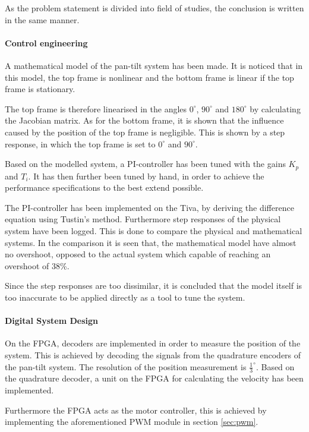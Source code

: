 \documentclass[../../main]{subfiles}
\begin{document}
As the problem statement is divided into field of studies, the conclusion is written in the same manner.

\paragraph{Control engineering}

A mathematical model of the pan-tilt system has been made.
It is noticed that in this model, the top frame is nonlinear and the bottom frame is linear if the top frame is stationary.

The top frame is therefore linearised in the angles $0^\circ$, $90^\circ$ and $180^\circ$ by calculating the Jacobian matrix.
As for the bottom frame, it is shown that the influence caused by the position of the top frame is negligible. This is shown by a step response, in which the top frame is set to $0^\circ$ and $90^\circ$.



Based on the modelled system, a PI-controller has been tuned with the gains $K_p$ and $T_i$. It has then further been tuned by hand, in order to achieve the performance specifications to the best extend possible.

The PI-controller has been implemented on the Tiva, by deriving the difference equation using Tustin's method.
Furthermore step responses of the physical system have been logged. This is done to compare the physical and mathematical systems.
In the comparison it is seen that, the mathematical model have almost no overshoot, opposed to the actual system which capable of reaching an overshoot of 38\%.

Since the step responses are too dissimilar, it is concluded that the model itself is too inaccurate to be applied directly as a tool to tune the system. 

\paragraph{Digital System Design}
On the FPGA, decoders are implemented in order to measure the position of the system.
This is achieved by decoding the signals from the quadrature encoders of the pan-tilt system.
The resolution of the position measurement is $\frac{1}{3}^\circ$.
Based on the quadrature decoder, a unit on the FPGA for calculating the velocity has been implemented.

Furthermore the FPGA acts as the motor controller, this is achieved by implementing the aforementioned PWM module in section \ref{sec:pwm}.
\end{document}
